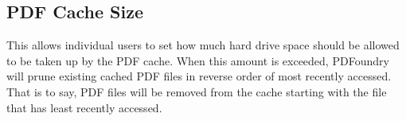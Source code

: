 \documentclass{article}
\begin{document}
    \begin{description}
        \item \subsection{PDF Cache Size} This allows individual users to set how much hard drive space should be allowed to be taken up by the PDF cache. When this amount is exceeded, PDFoundry will prune existing cached PDF files in reverse order of most recently accessed. That is to say, PDF files will be removed from the cache starting with the file that has least recently accessed.
    \end{description}
\end{document}
